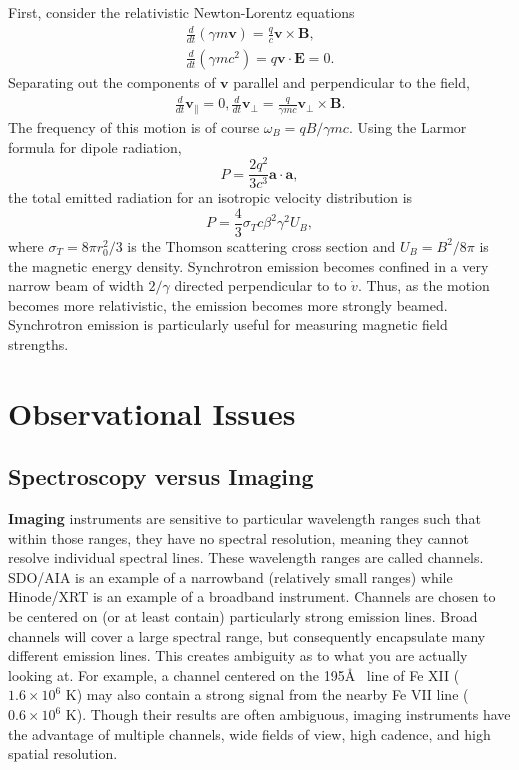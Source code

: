 	First, consider the relativistic Newton-Lorentz equations
	\begin{align}
		\frac{d}{dt}(\gamma m\mathbf{v}) = \frac{q}{c}\mathbf{v}\times\mathbf{B}, \\
		\frac{d}{dt}(\gamma mc^2)=q\mathbf{v}\cdot\mathbf{E}=0.
	\end{align}
	Separating out the components of $\mathbf{v}$ parallel and perpendicular to the field,
	\begin{align}
		\frac{d}{dt}\mathbf{v}_{\parallel} = 0,
		\frac{d}{dt}\mathbf{v}_{\perp} = \frac{q}{\gamma mc}\mathbf{v}_{\perp}\times\mathbf{B}.
	\end{align}
	The frequency of this motion is of course $\omega_B=qB/\gamma mc$. Using the Larmor formula for dipole radiation,
	\begin{equation}
		P=\frac{2q^2}{3c^3}\mathbf{a}\cdot\mathbf{a},
	\end{equation}
	the total emitted radiation for an isotropic velocity distribution is
	\begin{equation}
		P=\frac{4}{3}\sigma_Tc\beta^2\gamma^2U_B,
	\end{equation}
	where $\sigma_T=8\pi r_0^2/3$ is the Thomson scattering cross section and $U_B=B^2/8\pi$ is the magnetic energy density. Synchrotron emission becomes confined in a very narrow beam of width $2/\gamma$ directed perpendicular to to $\dot{v}$. Thus, as the motion becomes more relativistic, the emission becomes more strongly beamed. Synchrotron emission is particularly useful for measuring magnetic field strengths. 

\section{Observational Issues}

	\subsection{Spectroscopy versus Imaging}
	\textbf{Imaging} instruments are sensitive to particular wavelength ranges such that within those ranges, they have no spectral resolution, meaning they cannot resolve individual spectral lines. These wavelength ranges are called channels. SDO/AIA is an example of a narrowband (relatively small ranges) while Hinode/XRT is an example of a broadband instrument. Channels are chosen to be centered on (or at least contain) particularly strong emission lines. Broad channels will cover a large spectral range, but consequently encapsulate many different emission lines. This creates ambiguity as to what you are actually looking at. For example, a channel centered on the 195\AA~ line of Fe XII ($1.6\times10^6$ K) may also contain a strong signal from the nearby Fe VII line ($0.6\times10^6$ K). Though their results are often ambiguous, imaging instruments have the advantage of multiple channels, wide fields of view, high cadence, and high spatial resolution. 
	

